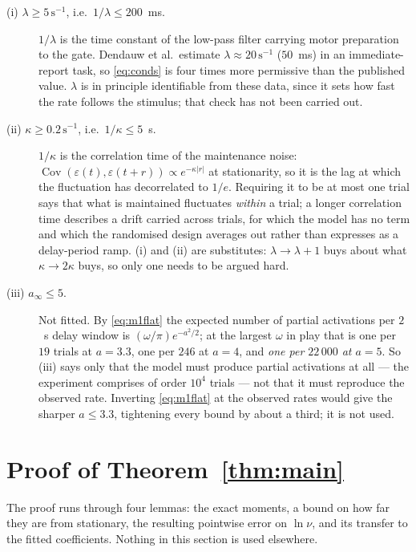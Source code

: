 \documentclass[11pt,a4paper]{article}
\theoremstyle{remark}\newtheorem{remark}[proposition]{Remark}
\newcommand{\Cov}{\operatorname{Cov}}
\begin{document}
\begin{description}
\item[(i) $\lambda\ge5\,\mathrm{s}^{-1}$, i.e.\ $1/\lambda\le200$~ms.]
$1/\lambda$ is the time constant of the low-pass filter carrying motor preparation to
the gate. Dendauw et al.\ estimate $\lambda\approx20\,\mathrm{s}^{-1}$ ($50$~ms) in an
immediate-report task, so \eqref{eq:conds} is four times more permissive than the
published value. $\lambda$ is in principle identifiable from these data, since it sets
how fast the rate follows the stimulus; that check has not been carried out.
\item[(ii) $\kappa\ge0.2\,\mathrm{s}^{-1}$, i.e.\ $1/\kappa\le5$~s.]
$1/\kappa$ is the correlation time of the maintenance noise:
$\Cov(\varepsilon(t),\varepsilon(t+r))\propto e^{-\kappa|r|}$ at stationarity, so it is
the lag at which the fluctuation has decorrelated to $1/e$. Requiring it to be at most
one trial says that what is maintained fluctuates \emph{within} a trial; a longer
correlation time describes a drift carried across trials, for which the model has no
term and which the randomised design averages out rather than expresses as a
delay-period ramp. (i) and (ii) are substitutes: $\lambda\to\lambda+1$ buys about what
$\kappa\to2\kappa$ buys, so only one needs to be argued hard.
\item[(iii) $a_\infty\le5$.] Not fitted. By \eqref{eq:m1flat} the expected number of
partial activations per $2$~s delay window is $(\omega/\pi)e^{-a^{2}/2}$; at the
largest $\omega$ in play that is one per $19$ trials at $a=3.3$, one per $246$ at
$a=4$, and \emph{one per $22\,000$ at $a=5$}. So (iii) says only that the model must
produce partial activations at all --- the experiment comprises of order $10^{4}$
trials --- not that it must reproduce the observed rate. Inverting \eqref{eq:m1flat} at
the observed rates would give the sharper $a\le3.3$, tightening every bound by about a
third; it is not used.
\end{description}

\section{Proof of Theorem~\ref{thm:main}}\label{sec:proof}

The proof runs through four lemmas: the exact moments, a bound on how far they are
from stationary, the resulting pointwise error on $\ln\nu$, and its transfer to the
fitted coefficients. Nothing in this section is used elsewhere.
\end{document}
